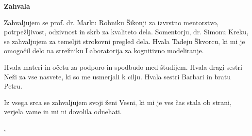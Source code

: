 ﻿\thispagestyle{empty}

\begin{center}
{\Large \textbf{\sc Zahvala}}
\end{center}
\vspace{0.5cm}

{\it\noindent

Zahvaljujem se prof. dr. Marku Robniku Šikonji za izvrstno mentorstvo, potrpežljivost, odzivnost in skrb za kvaliteto dela. Somentorju, dr. Simonu Kreku, se zahvaljujem za temeljit strokovni pregled dela. Hvala Tadeju Škvorcu, ki mi je omogočil delo na strežniku Laboratorija za kognitivno modeliranje.

Hvala materi in očetu za podporo in spodbudo med študijem. Hvala dragi sestri Neži za vse nasvete, ki so me usmerjali k cilju. Hvala sestri Barbari in bratu Petru.

Iz vsega srca se zahvaljujem svoji ženi Vesni, ki mi je ves čas stala ob strani, verjela vame in mi ni dovolila odnehati.

\vspace{0.5cm} \hfill \tauthor, \myyear
}
